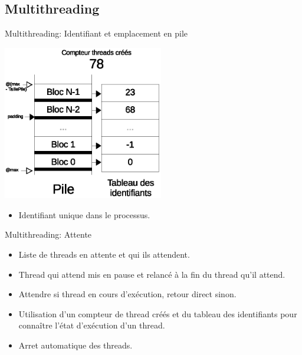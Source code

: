 \documentclass{beamer}
\begin{document}
\subsection{Multithreading}
\begin{frame}{Multithreading: Identifiant et emplacement en pile}
	\begin{center}
    	\includegraphics[width=7cm]{../rapport/schema_threads_id.eps}
	\end{center}
   \begin{itemize}
       \item Identifiant unique dans le processus.
   \end{itemize}
\end{frame}

\begin{frame}{Multithreading: Attente}
   \begin{itemize}
       \item Liste de threads en attente et qui ils attendent.
		\item Thread qui attend mis en pause et relancé à la fin du thread qu'il attend.
       \item Attendre si thread en cours d'exécution, retour direct sinon.
       \item Utilisation d'un compteur de thread créés et du tableau des identifiants pour connaître l'état d'exécution d'un thread.
       \item Arret automatique des threads.
   \end{itemize}
\end{frame}
\end{document}
